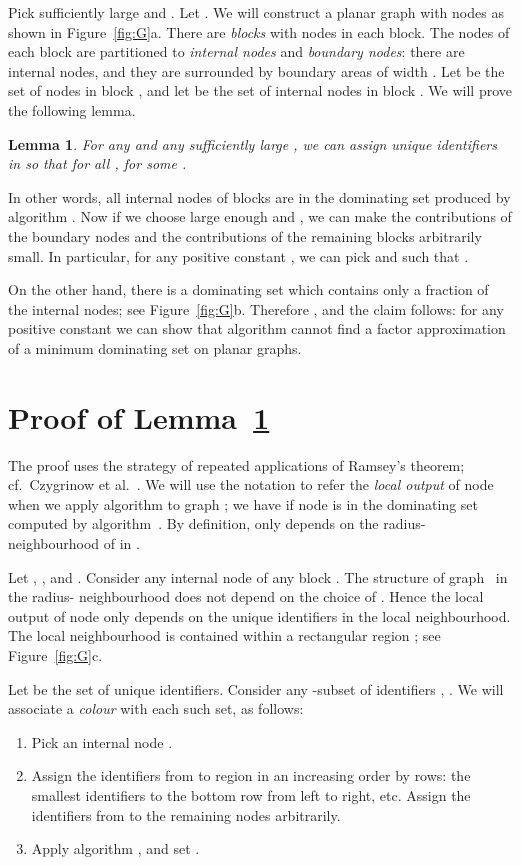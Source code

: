 \documentclass[11pt,a4paper]{article}
\newtheorem{lemma}[theorem]{Lemma}
\theoremstyle{definition}
\begin{document}
Pick sufficiently large  and . Let . We will construct a planar graph  with  nodes as shown in Figure~\ref{fig:G}a. There are  \emph{blocks} with  nodes in each block. The nodes of each block are partitioned to \emph{internal nodes} and \emph{boundary nodes}: there are  internal nodes, and they are surrounded by boundary areas of width . Let  be the set of nodes in block , and let  be the set of internal nodes in block . We will prove the following lemma.
\begin{lemma}\label{lem:main}
    For any  and any sufficiently large , we can assign unique identifiers in  so that  for all , for some .
\end{lemma}
In other words, all internal nodes of blocks  are in the dominating set  produced by algorithm . Now if we choose large enough  and , we can make the contributions of the boundary nodes and the contributions of the remaining  blocks arbitrarily small. In particular, for any positive constant , we can pick  and  such that .

On the other hand, there is a dominating set  which contains only a fraction  of the internal nodes; see Figure~\ref{fig:G}b. Therefore , and the claim follows: for any positive constant  we can show that algorithm  cannot find a factor  approximation of a minimum dominating set on planar graphs.


\section{Proof of Lemma~\ref{lem:main}}

The proof uses the strategy of repeated applications of Ramsey's theorem; cf.\ Czygrinow et al.~\cite[Lemma~4]{czygrinow08fast}. We will use the notation  to refer the \emph{local output} of node  when we apply algorithm  to graph ; we have  if node  is in the dominating set computed by algorithm~. By definition,  only depends on the radius- neighbourhood of  in .

Let , , and . Consider any internal node  of any block . The structure of graph~ in the radius- neighbourhood does not depend on the choice of . Hence the local output of node  only depends on the unique identifiers in the local neighbourhood. The local neighbourhood is contained within a rectangular  region ; see Figure~\ref{fig:G}c.

Let  be the set of unique identifiers. Consider any -subset of identifiers , . We will associate a \emph{colour}  with each such set, as follows:
\begin{enumerate}[noitemsep]
    \item Pick an internal node .
    \item Assign the identifiers from  to region  in an increasing order by rows: the smallest  identifiers to the bottom row from left to right, etc. Assign the identifiers from  to the remaining nodes arbitrarily.
    \item Apply algorithm , and set .
\end{enumerate}
\end{document}
